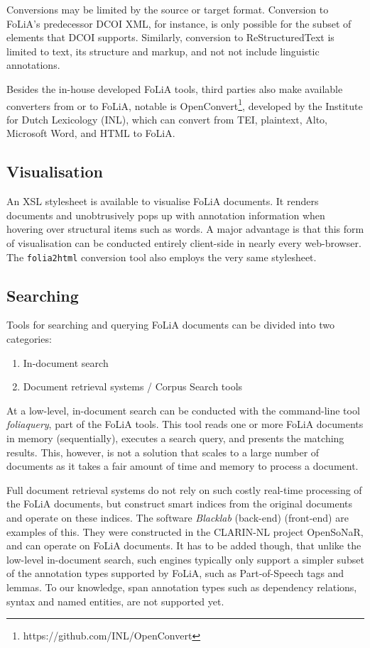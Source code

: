 \documentclass[a4paper,11pt]{article}
\begin{document}
Conversions may be limited by the source or target format. Conversion to
FoLiA's predecessor DCOI XML, for instance, is only possible for the subset of
elements that DCOI supports. Similarly, conversion to
ReStructuredText is limited
to text, its structure and markup, and not not include linguistic annotations.

Besides the in-house developed FoLiA tools, third parties also make available
converters from or to FoLiA, notable is
OpenConvert\footnote{https://github.com/INL/OpenConvert}, developed by the Institute for Dutch Lexicology (INL),
which can convert from TEI, plaintext, Alto, Microsoft Word, and HTML to
FoLiA.

\subsection{Visualisation}

An XSL stylesheet is available to visualise FoLiA documents. It renders
documents and unobtrusively pops up with annotation information when hovering
over structural items such as words. A major advantage is that this form of
visualisation can be conducted entirely client-side in nearly every
web-browser. The \texttt{folia2html} conversion tool also employs the very same
stylesheet.

\subsection{Searching}

Tools for searching and querying FoLiA documents can be divided into two
categories:

\begin{enumerate}
 \item In-document search
 \item Document retrieval systems / Corpus Search tools
\end{enumerate}

At a low-level, in-document search can be conducted with the command-line tool
\emph{foliaquery}, part of the FoLiA tools. This tool reads one or more FoLiA
documents in memory (sequentially), executes a search query, and presents the
matching results. This, however, is not a solution that scales to a large
number of documents as it takes a fair amount of time and memory to process a document.

Full document retrieval systems do not rely on such costly real-time processing
of the FoLiA documents, but construct smart indices from the original documents
and operate on these indices. The software \emph{Blacklab} (back-end)
\cite{BLACKLAB} (front-end) \cite{WHITELAB} are examples of this. They were %
constructed in the CLARIN-NL project OpenSoNaR, and can operate on FoLiA
documents. It has to be added though, that unlike the low-level in-document
search, such engines typically only support a simpler subset of the annotation
types supported by FoLiA, such as Part-of-Speech tags and lemmas. To our
knowledge, span annotation types such as dependency relations, syntax and named
entities, are not supported yet.
\end{document}
